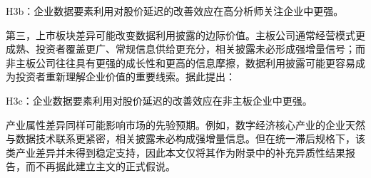 H3b：企业数据要素利用对股价延迟的改善效应在高分析师关注企业中更强。

第三，上市板块差异可能改变数据利用披露的边际价值。主板公司通常经营模式更成熟、投资者覆盖更广、常规信息供给更充分，相关披露未必形成强增量信号；而非主板公司往往具有更强的成长性和更高的信息摩擦，数据利用披露可能更容易成为投资者重新理解企业价值的重要线索。据此提出：

H3c：企业数据要素利用对股价延迟的改善效应在非主板企业中更强。

产业属性差异同样可能影响市场的先验预期。例如，数字经济核心产业的企业天然与数据技术联系更紧密，相关披露未必构成强增量信息。但在统一滞后规格下，该类产业差异并未得到稳定支持，因此本文仅将其作为附录中的补充异质性结果报告，而不再据此建立主文的正式假说。
